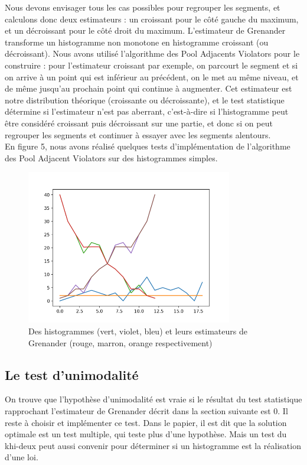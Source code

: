 \documentclass{article}
\begin{document}
Nous devons envisager tous les cas possibles pour regrouper les segments, et calculons donc deux estimateurs : un croissant pour le côté gauche du maximum, et un décroissant pour le côté droit du maximum. L'estimateur de Grenander transforme un histogramme non monotone en histogramme croissant (ou décroissant).  Nous avons utilisé l'algorithme des Pool Adjacents Violators pour le construire : pour l'estimateur croissant par exemple, on parcourt le segment et si on arrive à un point qui est inférieur au précédent, on le met au même niveau, et de même jusqu'au prochain point qui continue à augmenter. Cet estimateur est notre distribution théorique (croissante ou décroissante), et le test statistique détermine si l'estimateur n'est pas aberrant, c'est-à-dire si l'histogramme peut être considéré croissant puis décroissant sur une partie, et donc si on peut regrouper les segments et continuer à essayer avec les segments alentours.\\

En figure 5, nous avons réalisé quelques tests d'implémentation de l'algorithme des Pool Adjacent Violators sur des histogrammes simples.\\

\begin{figure}[h]
    \centering
    \includegraphics[width=9cm]{fig5.png}
    \caption{Des histogrammes (vert, violet, bleu) et leurs estimateurs de Grenander (rouge, marron, orange respectivement)}
\end{figure}

\subsection{Le test d'unimodalité}

On trouve que l'hypothèse d'unimodalité est vraie si le résultat du test statistique rapprochant l'estimateur de Grenander décrit dans la section suivante est 0. Il reste à choisir et implémenter ce test. Dans le papier, il est dit que la solution optimale est un test multiple, qui teste plus d'une hypothèse. Mais un test du khi-deux peut aussi convenir pour déterminer si un histogramme est la réalisation d'une loi. \\
\end{document}
